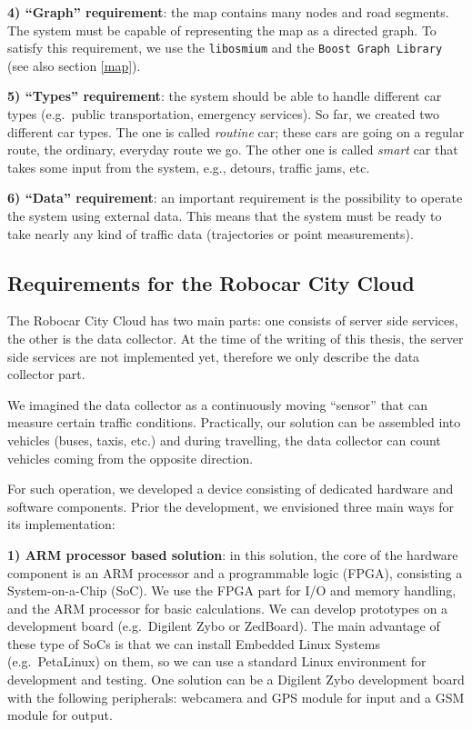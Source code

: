 \documentclass[b5paper,12pt]{report}
\theoremstyle{definition}
\begin{document}
{\bf{4) \enquote{Graph} requirement}}: the map contains many nodes and road segments. The system must be capable of representing the map as a directed graph. To satisfy this requirement, we use the \texttt{libosmium} and the \texttt{Boost Graph Library} (see also section \ref{map}).

{\bf{5) \enquote{Types} requirement}}: the system should be able to handle different car types (e.g.~public transportation, emergency services). So far, we created two different car types. The one is called \textit{routine} car; these cars are going on a regular route, the ordinary, everyday route we go. The other one is called \textit{smart} car that takes some input from the system, e.g., detours, traffic jams, etc.

{\bf{6) \enquote{Data} requirement}}: an important requirement is the possibility to operate the system using external data. This means that the system must be ready to take nearly any kind of traffic data (trajectories or point measurements).

\subsection{Requirements for the Robocar City Cloud}

The Robocar City Cloud has two main parts: one consists of server side services, the other is the data collector. At the time of the writing of this thesis, the server side services are not implemented yet, therefore we only describe the data collector part.

We imagined the data collector as a continuously moving \enquote{sensor} that can measure certain traffic conditions. Practically, our solution can be assembled into vehicles (buses, taxis, etc.) and during travelling, the data collector can count vehicles coming from the opposite direction.

For such operation, we developed a device consisting of dedicated hardware and software components. Prior the development, we envisioned three main ways for its implementation:

{\bf{1) ARM processor based solution}}: in this solution, the core of the hardware component is an ARM processor and a programmable logic (FPGA), consisting a System-on-a-Chip (SoC). We use the FPGA part for I/O and memory handling, and the ARM processor for basic calculations. We can develop prototypes on a development board (e.g.\ Digilent Zybo or ZedBoard). The main advantage of these type of SoCs is that we can install Embedded Linux Systems (e.g.\ PetaLinux) on them, so we can use a standard Linux environment for development and testing. 
One solution can be a Digilent Zybo development board with the following peripherals: webcamera and GPS module for input and a GSM module for output.
\end{document}
